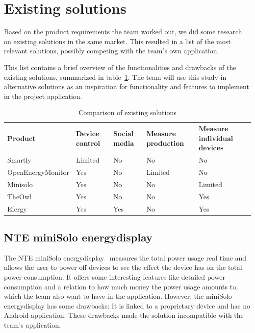 \section{Existing solutions}
\label{sec:altsolution}
Based on the product requirements the team worked out, we did some research on existing solutions in the same market. This resulted in a list of the most relevant solutions, possibly competing with the team's own application.
 
This list contains a brief overview of the functionalities and drawbacks of the existing solutions, summarized in table~\ref{tab:existingSolutions}. The team will use this study in alternative solutions as an inspiration for functionality and features to implement in the project application.


\begin{table}[H]
\centering
{}
\begin{tabular}{|l|l|p{2.6cm}|p{2.3cm}|p{2.2cm}|}
\hline
\textbf{Product} & \textbf{Device control} & \textbf{Social media} & \textbf{Measure production} & \textbf{Measure individual devices} \\
Smartly & Limited & No  & No & No\\
OpenEnergyMonitor & Yes & No  & Limited & No \\
Minisolo & Yes & No  & No & Limited\\
TheOwl & Yes & No & No & Yes\\
Efergy & Yes & Yes &  No & Yes\\\hline
\end{tabular}
\caption{Comparison of existing solutions}
\label{tab:existingSolutions}
\end{table}


\subsection{NTE miniSolo energydisplay}

The NTE miniSolo energydisplay~\cite{nte} measures the total power usage real time and allows the user to power off devices to see the effect the device has on the total power consumption. It offers some interesting features like detailed power consumption and a relation to how much money the power usage amounts to, which the team also want to have in the application. However, the miniSolo energydisplay has some drawbacks: It is linked to a proprietary device and has no Android application. These drawbacks made the solution incompatible with the team's application.


